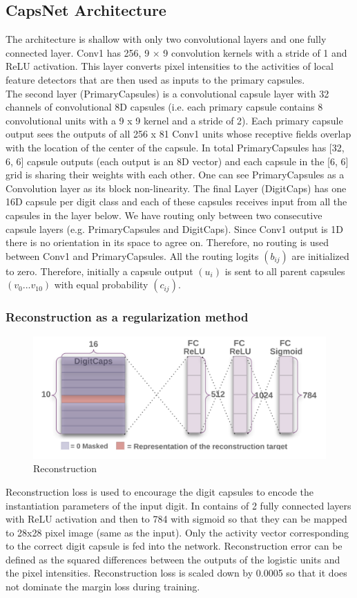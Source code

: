 \documentclass[10pt,twocolumn,letterpaper]{article}
\begin{document}
\subsection{CapsNet Architecture}
The architecture is shallow with only two convolutional layers and one fully connected layer. Conv1 has 256, 9 × 9 convolution kernels with a stride of 1 and ReLU activation. This layer converts pixel intensities to the activities of local feature detectors that are then used as inputs to the primary capsules.\\
The second layer (PrimaryCapsules) is a convolutional capsule layer with 32 channels of convolutional 8D capsules (i.e. each primary capsule contains 8 convolutional units with a 9 x 9 kernel and a stride of 2). Each primary capsule output sees the outputs of all 256 x 81 Conv1 units whose receptive fields overlap with the location of the center of the capsule. In total PrimaryCapsules has [32, 6, 6] capsule outputs (each output is an 8D vector) and each capsule in the [6, 6] grid is sharing their weights with each other. One can see PrimaryCapsules as a Convolution layer as its block non-linearity. The final Layer (DigitCaps) has one 16D capsule per digit class and each of these capsules receives input from all the capsules in the layer below.
We have routing only between two consecutive capsule layers (e.g. PrimaryCapsules and DigitCaps). Since Conv1 output is 1D there is no orientation in its space to agree on. Therefore, no routing is used between Conv1 and PrimaryCapsules. All the routing logits $(b_{ij})$ are initialized to zero. Therefore, initially a capsule output $(u_i)$ is sent to all parent capsules $(v_0 ...v_{10})$ with equal probability $(c_{ij})$.

\subsubsection{Reconstruction as a regularization method}
\begin{figure}[ht]
	\includegraphics[width=\columnwidth]{2}
	\caption{Reconstruction}
\end{figure}
Reconstruction loss is used to encourage the digit capsules to encode the instantiation parameters of the input digit. In contains of 2 fully connected layers with ReLU activation and then to 784 with sigmoid so that they can be mapped to 28x28 pixel image (same as the input). Only the activity vector corresponding to the correct digit capsule is fed into the network. Reconstruction error can be defined as the squared differences between the outputs of the logistic units and the pixel intensities. Reconstruction loss is scaled down by 0.0005 so that it does not dominate the margin loss during training.
\end{document}
